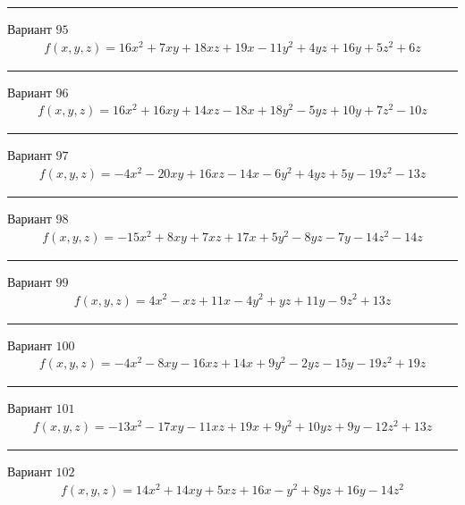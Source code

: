 \documentclass[11pt]{report}
\begin{document}
\begin{center}
\noindent\rule{8cm}{0.4pt}
\end{center}
Вариант $95$
\begin{align*}
    f(x, y, z) = 16 x^{2} + 7 x y + 18 x z + 19 x - 11 y^{2} + 4 y z + 16 y + 5 z^{2} + 6 z
\end{align*}
\begin{center}
\noindent\rule{8cm}{0.4pt}
\end{center}
Вариант $96$
\begin{align*}
    f(x, y, z) = 16 x^{2} + 16 x y + 14 x z - 18 x + 18 y^{2} - 5 y z + 10 y + 7 z^{2} - 10 z
\end{align*}
\begin{center}
\noindent\rule{8cm}{0.4pt}
\end{center}
Вариант $97$
\begin{align*}
    f(x, y, z) = - 4 x^{2} - 20 x y + 16 x z - 14 x - 6 y^{2} + 4 y z + 5 y - 19 z^{2} - 13 z
\end{align*}
\begin{center}
\noindent\rule{8cm}{0.4pt}
\end{center}
Вариант $98$
\begin{align*}
    f(x, y, z) = - 15 x^{2} + 8 x y + 7 x z + 17 x + 5 y^{2} - 8 y z - 7 y - 14 z^{2} - 14 z
\end{align*}
\begin{center}
\noindent\rule{8cm}{0.4pt}
\end{center}
Вариант $99$
\begin{align*}
    f(x, y, z) = 4 x^{2} - x z + 11 x - 4 y^{2} + y z + 11 y - 9 z^{2} + 13 z
\end{align*}
\begin{center}
\noindent\rule{8cm}{0.4pt}
\end{center}
Вариант $100$
\begin{align*}
    f(x, y, z) = - 4 x^{2} - 8 x y - 16 x z + 14 x + 9 y^{2} - 2 y z - 15 y - 19 z^{2} + 19 z
\end{align*}
\begin{center}
\noindent\rule{8cm}{0.4pt}
\end{center}
Вариант $101$
\begin{align*}
    f(x, y, z) = - 13 x^{2} - 17 x y - 11 x z + 19 x + 9 y^{2} + 10 y z + 9 y - 12 z^{2} + 13 z
\end{align*}
\begin{center}
\noindent\rule{8cm}{0.4pt}
\end{center}
Вариант $102$
\begin{align*}
    f(x, y, z) = 14 x^{2} + 14 x y + 5 x z + 16 x - y^{2} + 8 y z + 16 y - 14 z^{2}
\end{align*}
\end{document}
